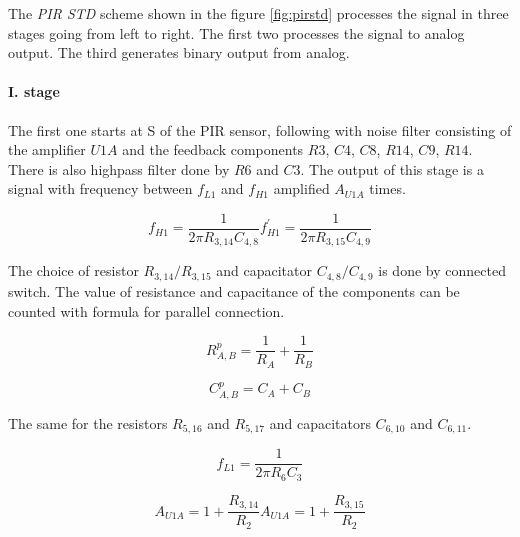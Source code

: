 The {\it PIR STD} scheme shown in the figure \ref{fig:pirstd} processes the signal
in three stages going from left to right. The first two processes the signal to analog output.
The third generates binary output from analog.

\paragraph{I. stage}
The first one starts at S of the PIR sensor, following with noise filter consisting of the
amplifier $U1A$ and the feedback components $R3$, $C4$, $C8$, $R14$, $C9$, $R14$.
There is also highpass filter done by $R6$ and $C3$. The output of this stage is a signal
with frequency between $f_{L1}$ and $f_{H1}$ amplified $A_{U1A}$ times.

\begin{subequations}
\begin{equation}
f_{H1} = \frac{1}{2 \pi R_{3,14} C_{4,8}}
\end{equation}

\begin{equation}
f_{H1}^{'} = \frac{1}{2 \pi R_{3,15} C_{4,9}}
\end{equation}
\end{subequations}

The choice of resistor $R_{3,14} / R_{3,15}$ and capacitator $C_{4,8} / C_{4,9}$
is done by connected switch. The value of resistance and capacitance of the
components can be counted with formula for parallel connection.

\begin{equation}
R_{A,B}^{p} = \frac{1}{R_A} + \frac{1}{R_B}
\end{equation}

\begin{equation}
C_{A,B}^{p} = C_A + C_B
\end{equation}

The same for the resistors $R_{5,16}$ and $R_{5,17}$ and capacitators $C_{6,10}$ and $C_{6,11}$.

\begin{equation}
f_{L1} = \frac{1}{2 \pi R_6 C_3}
\end{equation}

\begin{subequations}
\begin{equation}
A_{U1A} = 1 + \frac{R_{3,14}}{R_2}
\end{equation}
\begin{equation}
A_{U1A} = 1 + \frac{R_{3,15}}{R_2}
\end{equation}
\end{subequations}

